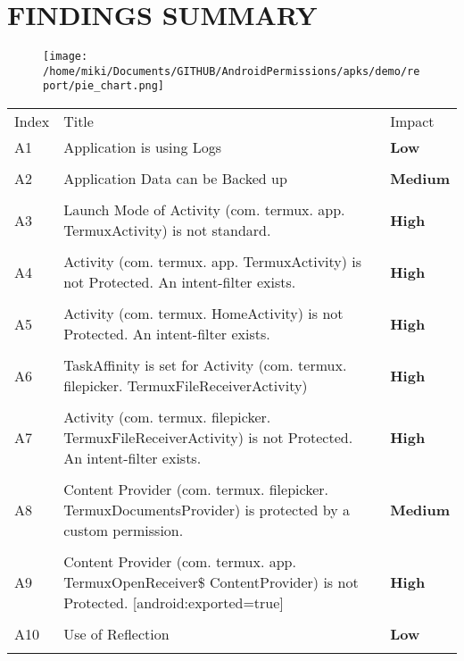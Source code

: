 \documentclass[12p]{article}
\begin{document}
\section{FINDINGS SUMMARY}\label{sec:summary}
\begin{figure}[H]
\centering
	\texttt{[image: /home/miki/Documents/GITHUB/AndroidPermissions/apks/demo/report/pie\_chart.png]}
\end{figure}
	\begin{longtable}{p{0.5cm} p{10cm} p{1.5cm}}
	\rowcolor{grannysmithapple!70} Index & Title & Impact \\
	A1&Application is using Logs& \color{amber}\textbf{Low} \\
\hline\\	A2&Application Data can be Backed up& \color{orange(colorwheel)}\textbf{Medium} \\
\hline\\	A3&Launch Mode of Activity \newline (com. termux. app. TermuxActivity) is not standard.& \color{ferrarired}\textbf{High} \\
\hline\\	A4&Activity \newline (com. termux. app. TermuxActivity) is not Protected. An intent-filter exists.& \color{ferrarired}\textbf{High} \\
\hline\\	A5&Activity \newline (com. termux. HomeActivity) is not Protected. An intent-filter exists.& \color{ferrarired}\textbf{High} \\
\hline\\	A6&TaskAffinity is set for Activity \newline (com. termux. filepicker. TermuxFileReceiverActivity)& \color{ferrarired}\textbf{High} \\
\hline\\	A7&Activity \newline (com. termux. filepicker. TermuxFileReceiverActivity) is not Protected. An intent-filter exists.& \color{ferrarired}\textbf{High} \\
\hline\\	A8&Content Provider \newline (com. termux. filepicker. TermuxDocumentsProvider) is protected by a custom permission.& \color{orange(colorwheel)}\textbf{Medium} \\
\hline\\	A9&Content Provider \newline (com. termux. app. TermuxOpenReceiver\$ ContentProvider) is not Protected. [android:exported=true]& \color{ferrarired}\textbf{High} \\
\hline\\	A10&Use of Reflection& \color{amber}\textbf{Low} \\
\hline\\	\end{longtable}
\cleardoublepage
\newpage
\end{document}
